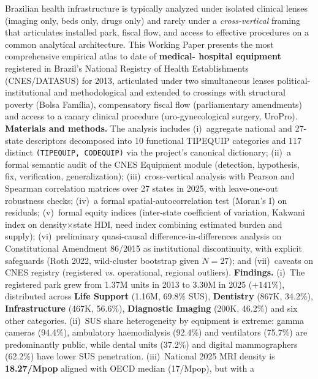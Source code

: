 \documentclass[12pt,a4paper,oneside]{article}
\begin{document}
\begin{singlespace}\small\noindent
Brazilian health infrastructure is typically analyzed under
isolated clinical lenses (imaging only, beds only, drugs only) and
rarely under a \textit{cross-vertical} framing that articulates
installed park, fiscal flow, and access to effective procedures on
a common analytical architecture. This Working Paper presents the
most comprehensive empirical atlas to date of \textbf{medical-
hospital equipment} registered in Brazil's National Registry of
Health Establishments (CNES/DATASUS) for 2013,
articulated under two simultaneous lenses
\textemdash{} political-institutional and methodological
\textemdash{} and extended to crossings with structural poverty
(Bolsa Família), compensatory fiscal flow (parliamentary
amendments) and access to a canary clinical procedure
(uro-gynecological surgery, UroPro). \textbf{Materials and
methods.} The analysis includes (i)~aggregate national and
27-state descriptors decomposed into 10 functional TIPEQUIP
categories and 117 distinct \texttt{(TIPEQUIP, CODEQUIP)} via the
project's canonical dictionary;
(ii)~a formal semantic audit of the CNES Equipment module
(detection, hypothesis, fix, verification, generalization);
(iii)~cross-vertical analysis with Pearson and Spearman
correlation matrices over 27 states in 2025, with leave-one-out
robustness checks; (iv)~a formal spatial-autocorrelation test
(Moran's I) on residuals; (v)~formal equity indices (inter-state
coefficient of variation, Kakwani index on density$\times$state
HDI, need index combining estimated burden and supply);
(vi)~preliminary quasi-causal difference-in-differences analysis
on Constitutional Amendment 86/2015 as institutional
discontinuity, with explicit safeguards (Roth 2022, wild-cluster
bootstrap given $N=27$); and (vii)~caveats on CNES registry
(registered \textit{vs.} operational, regional outliers).
\textbf{Findings.}
(i)~The registered park grew from 1.37M units in 2013 to 3.30M in
2025 ($+141\%$), distributed across \textbf{Life Support} (1.16M,
69.8\% SUS), \textbf{Dentistry} (867K, 34.2\%),
\textbf{Infrastructure} (467K, 56.6\%),
\textbf{Diagnostic Imaging} (200K, 46.2\%) and six other
categories.
(ii)~SUS share heterogeneity by equipment is extreme: gamma
cameras (94.4\%), ambulatory haemodialysis (92.4\%) and
ventilators (75.7\%) are predominantly public, while dental units
(37.2\%) and digital mammographers (62.2\%) have lower SUS
penetration.
(iii)~National 2025 MRI density is \textbf{18.27/Mpop}
\textemdash{} aligned with OECD median (17/Mpop), but with a

\end{singlespace}
\end{document}
